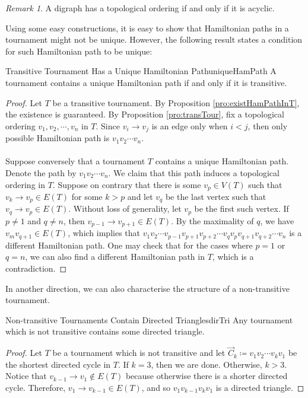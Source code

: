 \documentclass[math, code]{amznotes}
\theoremstyle{remark}
\newtheorem*{remark}{Remark}
\begin{document}
\begin{notebox}
    \begin{remark}
        A digraph has a topological ordering if and only if it is acyclic.
    \end{remark}
\end{notebox}
Using some easy constructions, it is easy to show that Hamiltonian paths in a tournament might not be unique. However, the following result states a condition for such Hamiltonian path to be unique:
\begin{probox}{Transitive Tournament Has a Unique Hamiltonian Path}{uniqueHamPath}
    A tournament contains a unique Hamiltonian path if and only if it is transitive.
    \tcblower
    \begin{proof}
        Let $T$ be a transitive tournament. By Proposition \ref{pro:existHamPathInT}, the existence is guaranteed. By Proposition \ref{pro:transTour}, fix a topological ordering $v_1, v_2, \cdots, v_n$ in $T$. Since $v_i \to v_j$ is an edge only when $i < j$, then only possible Hamiltonian path is $v_1v_2\cdots v_n$.
        \\\\
        Suppose conversely that a tournament $T$ contains a unique Hamiltonian path. Denote the path by $v_1v_2\cdots v_n$. We claim that this path induces a topological ordering in $T$. Suppose on contrary that there is some $v_p \in V(T)$ such that $v_k \to v_p \in E(T)$ for some $k > p$ and let $v_q$ be the last vertex such that $v_q \to v_p \in E(T)$. Without loss of generality, let $v_p$ be the first such vertex. If $p \neq 1$ and $q \neq n$, then $v_{p - 1} \to v_{p + 1} \in E(T)$. By the maximality of $q$, we have $v_mv_{q + 1} \in E(T)$, which implies that $v_1v_2\cdots v_{p - 1}v_{p + 1}v_{p + 2}\cdots v_qv_pv_{q + 1}v_{q + 2}\cdots v_n$ is a different Hamiltonian path. One may check that for the cases where $p = 1$ or $q = n$, we can also find a different Hamiltonian path in $T$, which is a contradiction.
    \end{proof}
\end{probox}
In another direction, we can also characterise the structure of a non-transitive tournament.
\begin{probox}{Non-transitive Tournaments Contain Directed Triangles}{dirTri}
    Any tournament which is not transitive contains some directed triangle.
    \tcblower
    \begin{proof}
        Let $T$ be a tournament which is not transitive and let $\overrightarrow{C}_k \coloneqq v_1v_2\cdots v_kv_1$ be the shortest directed cycle in $T$. If $k = 3$, then we are done. Otherwise, $k > 3$. Notice that $v_{k - 1} \to v_1 \notin E(T)$ because otherwise there is a shorter directed cycle. Therefore, $v_1 \to v_{k - 1} \in E(T)$, and so $v_1v_{k - 1}v_kv_1$ is a directed triangle.
    \end{proof}
\end{probox}
\end{document}
